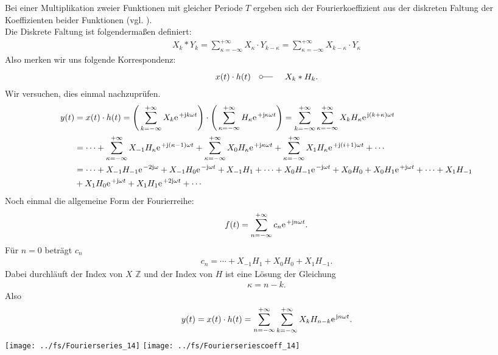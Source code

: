 \documentclass[11pt,a4paper,DIV=12]{scrartcl}
\begin{document}
Bei einer Multiplikation zweier Funktionen mit gleicher Periode $T$ ergeben sich der Fourierkoeffizient aus der diskreten Faltung der Koeffizienten beider Funktionen (vgl. \cite[S. 208]{Oppenheim1997_2}).\\
Die Diskrete Faltung ist folgendermaßen definiert:
\begin{align}
	X_k\ast Y_k=\sum_{\kappa = -\infty}^{+\infty}X_{\kappa}\cdot Y_{k-\kappa}=\sum_{\kappa =-\infty}^{+\infty}X_{k-\kappa}\cdot Y_{\kappa }
\end{align}
Also merken wir uns folgende Korrespondenz:
\begin{align}
	x(t)\cdot h(t)\quad\fourier\quad X_k \ast H_k.
\end{align}
Wir versuchen, dies einmal nachzuprüfen.
\begin{align}
	y(t)&=x(t)\cdot h(t)=\Bigg (\sum_{k=-\infty}^{+\infty}X_k\e^{+\im k \omega t}\Bigg )\cdot\Bigg ( \sum_{\kappa=-\infty}^{+\infty}H_{\kappa}\e^{+\im \kappa \omega t}\Bigg )=\sum_{k=-\infty}^{+\infty}\sum_{\kappa=-\infty}^{+\infty}X_kH_{\kappa}\e^{\im (k+\kappa)\omega t}\nonumber \\
	&=\cdots +\sum_{\kappa=-\infty}^{+\infty}X_{-1}H_{\kappa}\e^{+\im(\kappa-1)\omega t}+\sum_{\kappa=-\infty}^{+\infty}X_0H_{\kappa}\e^{+\im \kappa \omega t}+\sum_{\kappa=-\infty}^{+\infty}X_1H_{\kappa}\e^{+\im(i+1)\omega t}+\cdots\nonumber \\
	&=\cdots+X_{-1}H_{-1}\e^{-2\im \omega }+X_{-1}H_0\e^{-\im \omega t}+X_{-1}H_1+\cdots+X_0H_{-1}\e^{-\im \omega t}+X_0H_0+X_0H_1\e^{+\im  \omega t}+\cdots +X_1H_{-1}\nonumber \\
	&+X_1H_0\e^{+\im \omega t}+X_1H_1\e^{+2\im \omega t}+\cdots
\end{align}
Noch einmal die allgemeine Form der Fourierreihe:
\begin{align}
	f(t)=\sum_{n=-\infty}^{+\infty}c_n\e^{+\im n \omega t}.
\end{align}
Für $n=0$ beträgt $c_n$
\begin{align}
	c_n=\cdots + X_{-1}H_{1}+X_0H_0+X_1H_{-1}.
\end{align}
Dabei durchläuft der Index von $X$ $\mathbb{Z}$ und der Index von $H$ ist eine Lösung der Gleichung
\begin{align}
	\kappa = n-k.
\end{align}
Also
\begin{align}
	y(t)=x(t)\cdot h(t)=\sum_{n=-\infty}^{+\infty}\sum_{k=-\infty}^{+\infty}X_kH_{n-k}\e^{\im n \omega t}.
\end{align}
\newpage
\texttt{[image: ../fs/Fourierseries\_14]}
\texttt{[image: ../fs/Fourierseriescoeff\_14]}
\newpage
\end{document}
